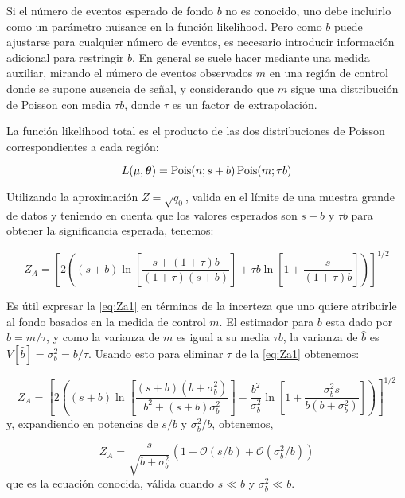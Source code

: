 Si el número de eventos esperado de fondo $b$ no es conocido, uno debe incluirlo
como un parámetro nuisance en la función likelihood. Pero como $b$ puede
ajustarse para cualquier número de eventos, es necesario introducir información
adicional para restringir $b$. En general se suele hacer mediante una medida
auxiliar, mirando el número de eventos observados $m$ en una región de control
donde se supone ausencia de señal, y considerando que $m$ sigue
una distribución de Poisson con media $\tau b$, donde $\tau$ es un factor de
extrapolación.

La función likelihood total es el producto de las dos distribuciones de Poisson
correspondientes a cada región:

\begin{equation}
  L(\mu, \bm{\theta}) = \operatorname{Pois} (n;s+b) \operatorname{Pois}(m;\tau b)
\end{equation}

Utilizando la aproximación $Z = \sqrt{q_0}$, valida en el límite de una muestra
grande de datos y teniendo en cuenta que los valores esperados son $s+b$ y $\tau
b$ para obtener la significancia esperada, tenemos:

\begin{equation}
  Z_A = \left[ 2 \left( (s+b) \ln \left[ \frac{s+(1+\tau)b}{(1+\tau)(s+b)}
      \right] + \tau b \ln \left[ 1 + \frac{s}{(1+\tau)b} \right] \right)
    \right]^{1/2}
  \label{eq:Za1}
\end{equation}

Es útil expresar la \cref{eq:Za1} en términos de la incerteza que uno
quiere atribuirle al fondo basados en la medida de control $m$. El estimador
para $b$ esta dado por $\hat{b} = m/\tau$, y como la varianza de $m$ es igual a
su media $\tau b$, la varianza de $\hat{b}$ es $V[\hat{b}] = \sigma_b^2 =
b/\tau$. Usando esto para eliminar $\tau$ de la \cref{eq:Za1}
obtenemos:

\begin{equation}
  Z_A = \left[ 2 \left( (s+b) \ln \left[
      \frac{(s+b)(b+\sigma_b^2)}{b^2+(s+b)\sigma_b^2} \right] -
    \frac{b^2}{\sigma_b^2} \ln \left[ 1 + \frac{\sigma_b^2 s}{b(b+\sigma_b^2)}
      \right] \right) \right]^{1/2}
  \label{eq:Za}
\end{equation}
%
y, expandiendo en potencias de $s/b$ y $\sigma_b^2/b$, obtenemos,

\begin{equation}
  Z_A = \frac{s}{\sqrt{b+\sigma_b^2}} \left( 1 + \mathcal{O}(s/b) + \mathcal{O}(\sigma_b^2/b) \right)
\end{equation}
%
que es la ecuación conocida, válida cuando $s\ll b$ y $\sigma_b^2 \ll b$.
